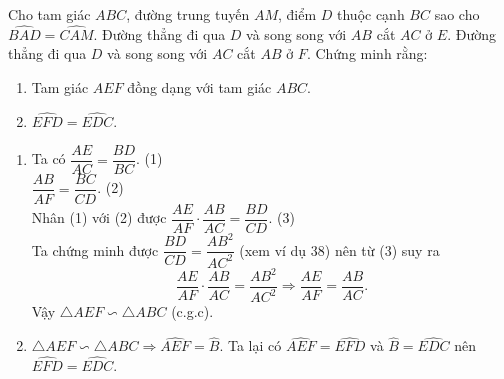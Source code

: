 \begin{bt}%
 Cho tam giác $ABC$, đường trung tuyến $AM$, điểm $D$ thuộc cạnh $BC$ sao cho $\widehat{BAD} = \widehat{CAM}$. Đường thẳng đi qua $D$ và song song với $AB$ cắt $AC$ ở $E$. Đường thẳng đi qua $D$ và song song với $AC$ cắt $AB$ ở $F$. Chứng minh rằng:
 \begin{enumerate}
  \item Tam giác $AEF$ đồng dạng với tam giác $ABC$.
  \item $\widehat{EFD} = \widehat{EDC}$.
 \end{enumerate}
 \loigiai
  {
  \begin{center}
  \end{center}
  \begin{enumerate}
   \item Ta có $\dfrac{AE}{AC} = \dfrac{BD}{BC}$. \hfill (1)\\
   $\dfrac{AB}{AF} = \dfrac{BC}{CD}$. \hfill (2)\\
   Nhân (1) với (2) được $\dfrac{AE}{AF} \cdot \dfrac{AB}{AC} = \dfrac{BD}{CD}$. \hfill (3)\\
   Ta chứng minh được $\dfrac{BD}{CD} = \dfrac{AB^2}{AC^2}$ (xem ví dụ 38) nên từ (3) suy ra 
   $$\dfrac{AE}{AF} \cdot \dfrac{AB}{AC} = \dfrac{AB^2}{AC^2} \Rightarrow \dfrac{AE}{AF} = \dfrac{AB}{AC}.$$
   Vậy $\triangle AEF \backsim \triangle ABC$ (c.g.c).\\
   \item $\triangle AEF \backsim \triangle ABC \Rightarrow \widehat{AEF} = \widehat{B}$. Ta lại có $\widehat{AEF} = \widehat{EFD}$ và $\widehat{B} = \widehat{EDC}$ nên $\widehat{EFD} = \widehat{EDC}$.
  \end{enumerate}
  }
\end{bt}


